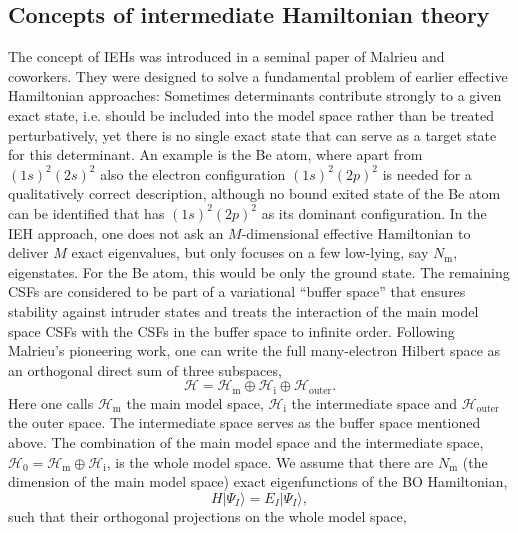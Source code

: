 \subsection{Concepts of intermediate Hamiltonian theory}
The concept of IEHs was introduced in a seminal paper of Malrieu and coworkers.\cite{MalriDD_1985_809} They were designed to solve a fundamental problem of earlier effective Hamiltonian approaches: Sometimes determinants contribute strongly to a given exact state, i.e. should be included into the model space rather than be treated perturbatively, yet there is no single exact state that can serve as a target state for this determinant. An example is the Be atom, where apart from $(1s)^2(2s)^2$ also the electron configuration $(1s)^2(2p)^2$ is needed for a qualitatively correct description, although no bound exited state of the Be atom can be identified that has $(1s)^2(2p)^2$ as its dominant configuration.\cite{HeullM_2009_76} In the IEH approach, one does not ask an $M$-dimensional effective Hamiltonian to deliver $M$ exact eigenvalues, but only focuses on a few low-lying, say $N_\text{m}$, eigenstates. For the Be atom, this would be only the ground state. The remaining CSFs are considered to be part of a variational ``buffer space'' that ensures stability against intruder states and treats the interaction of the main model space CSFs with the CSFs in the buffer space to infinite order.
Following Malrieu’s pioneering work,\cite{MalriDD_1985_809} one can write the full many-electron Hilbert space as an orthogonal direct sum of three subspaces, 
	\begin{equation}
	\label{Eq:H0_intermediateHamiltonian}
	\mathcal{H} = {\mathcal{H}_\text{m} } \oplus {\mathcal{H}_{\text{i}}} \oplus {\mathcal{H}_{{\text{outer}}}}.
	\end{equation}
Here one calls ${\mathcal{H}_\text{m} }$ the main model space, ${\mathcal{H}_{\text{i}}}$ the intermediate space and ${\mathcal{H}_{{\text{outer}}}}$ the outer space. The intermediate space serves as the buffer space mentioned above. The combination of the main model space and the intermediate space, ${\mathcal{H}_0} = {\mathcal{H}_\text{m} } \oplus {\mathcal{H}_{\text{i}}}$, is the whole model space. We assume that there are $N_\text{m}$ (the dimension of the main model space) exact eigenfunctions of the BO Hamiltonian,
	\begin{equation}
	H|{\Psi _I}\rangle  = {E_I}|{\Psi _I}\rangle, 
	\end{equation}
such that their orthogonal projections on the whole model space,
